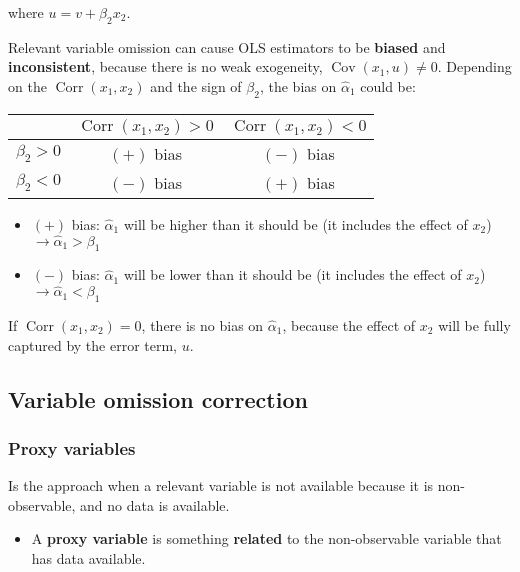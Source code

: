 \documentclass[10pt, a4paper, landscape]{article}
\DeclareMathOperator{\Cov}{Cov}
\DeclareMathOperator{\Corr}{Corr}
\begin{document}
\begin{multicols}{3}
\quad where \( u = v + \beta_{2} x_{2} \).

Relevant variable omission can cause OLS estimators to be \textbf{biased} and \textbf{inconsistent}, because there is no weak exogeneity, \( \Cov(x_{1}, u) \neq 0 \). Depending on the \( \Corr(x_{1}, x_{2}) \) and the sign of \( \beta_{2} \), the bias on \( \hat{\alpha}_{1} \) could be:

\begin{center}
	\begin{tabular}{ c | c c }
		                    & \( \Corr(x_{1}, x_{2}) > 0 \) & \( \Corr(x_{1}, x_{2}) < 0 \) \\ \hline
		\( \beta_{2} > 0 \) & \( (+) \) bias                & \( (-) \) bias                \\
		\( \beta_{2} < 0 \) & \( (-) \) bias                & \( (+) \) bias
	\end{tabular}
\end{center}

\begin{itemize}[leftmargin=*]
	\item \( (+) \) bias: \( \hat{\alpha}_{1} \) will be higher than it should be (it includes the effect of \( x_{2} \)) \( \rightarrow \hat{\alpha}_{1} > \beta_{1} \)
	\item \( (-) \) bias: \( \hat{\alpha}_{1} \) will be lower than it should be (it includes the effect of \( x_{2} \)) \( \rightarrow \hat{\alpha}_{1} < \beta_{1} \)
\end{itemize}

If \( \Corr(x_{1}, x_{2}) = 0 \), there is no bias on \( \hat{\alpha}_{1} \), because the effect of \( x_{2} \) will be fully captured by the error term, \( u \).

\columnbreak

\subsection*{Variable omission correction}

\subsubsection*{Proxy variables}

Is the approach when a relevant variable is not available because it is non-observable, and no data is available.

\begin{itemize}[leftmargin=*]
	\item A \textbf{proxy variable} is something \textbf{related} to the non-observable variable that has data available.
\end{itemize}


\end{multicols}
\end{document}
